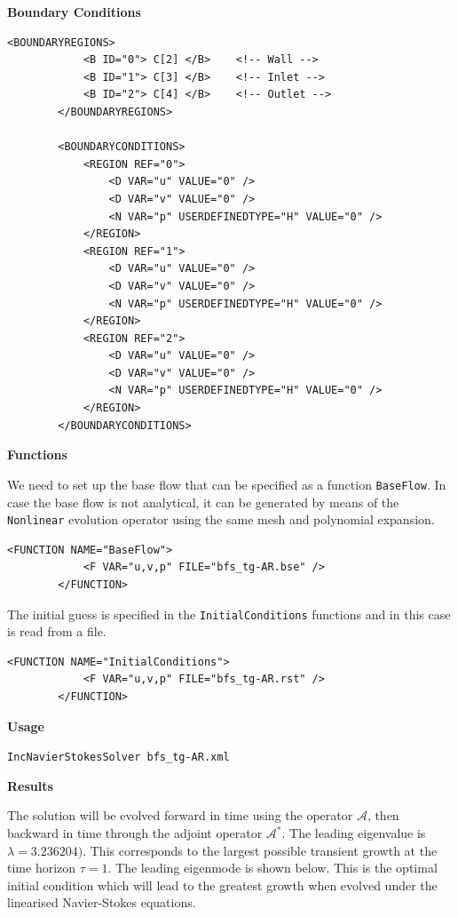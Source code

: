                         
\textbf{Boundary Conditions}

      \begin{lstlisting}[style=XMLStyle]
 <BOUNDARYREGIONS>
            <B ID="0"> C[2] </B>    <!-- Wall -->
            <B ID="1"> C[3] </B>    <!-- Inlet -->
            <B ID="2"> C[4] </B>    <!-- Outlet -->
        </BOUNDARYREGIONS>

        <BOUNDARYCONDITIONS>
            <REGION REF="0">
                <D VAR="u" VALUE="0" />
                <D VAR="v" VALUE="0" />
                <N VAR="p" USERDEFINEDTYPE="H" VALUE="0" />
            </REGION>
            <REGION REF="1">
                <D VAR="u" VALUE="0" />
                <D VAR="v" VALUE="0" />
                <N VAR="p" USERDEFINEDTYPE="H" VALUE="0" />
            </REGION>
            <REGION REF="2">
                <D VAR="u" VALUE="0" />
                <D VAR="v" VALUE="0" />
                <N VAR="p" USERDEFINEDTYPE="H" VALUE="0" />
            </REGION>
        </BOUNDARYCONDITIONS>
                                \end{lstlisting}

\textbf{Functions}

We need to set up the base flow that can be specified as a function \texttt{BaseFlow}. In case the base flow is not analytical, it can be generated by means of the \texttt{Nonlinear} evolution operator using the same mesh and polynomial expansion.

      \begin{lstlisting}[style=XMLStyle]
<FUNCTION NAME="BaseFlow">
            <F VAR="u,v,p" FILE="bfs_tg-AR.bse" />
        </FUNCTION>
                                        \end{lstlisting}


The initial guess is specified in the \texttt{InitialConditions} functions and in this case is read from a file. 
 
 \begin{lstlisting}[style=XMLStyle]  
<FUNCTION NAME="InitialConditions">
            <F VAR="u,v,p" FILE="bfs_tg-AR.rst" />
        </FUNCTION>
                                        \end{lstlisting}


\textbf{Usage}

\texttt{IncNavierStokesSolver bfs\_tg-AR.xml}

\textbf{Results}

The solution will be evolved forward in time using the operator $\mathcal{A}$, then backward in time through the adjoint operator $\mathcal{A}^*$. The leading eigenvalue is $\lambda= 3.236204)$. This corresponds to the largest possible transient growth at the time horizon $\tau= 1$. The leading eigenmode is shown below. This is the optimal initial condition which will lead to the greatest growth when evolved under the linearised Navier-Stokes equations.


